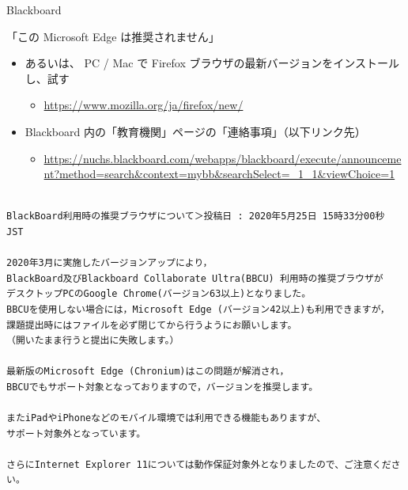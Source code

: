 \documentclass[a4j,10pt]{jsarticle}
\begin{document}
{\begin{frame}[label={sec:orgc119bb0},fragile]{Blackboard}
\begin{block}{「この Microsoft Edge は推奨されません」}
\begin{itemize}
\begin{itemize}
\end{itemize}
\par
\item あるいは、 PC / Mac で Firefox ブラウザの最新バージョンをインストールし、試す
\begin{itemize}
\item \url{https://www.mozilla.org/ja/firefox/new/}
\end{itemize}
\par
\item Blackboard 内の「教育機関」ページの「連絡事項」（以下リンク先）
\begin{itemize}
\item \url{https://nuchs.blackboard.com/webapps/blackboard/execute/announcement?method=search\&context=mybb\&searchSelect=\_1\_1\&viewChoice=1}
\end{itemize}
\end{itemize}
\par
\begin{verbatim}

BlackBoard利用時の推奨ブラウザについて＞投稿日 : 2020年5月25日 15時33分00秒 JST

2020年3月に実施したバージョンアップにより，
BlackBoard及びBlackboard Collaborate Ultra(BBCU) 利用時の推奨ブラウザが
デスクトップPCのGoogle Chrome(バージョン63以上)となりました。
BBCUを使用しない場合には，Microsoft Edge (バージョン42以上)も利用できますが，
課題提出時にはファイルを必ず閉じてから行うようにお願いします。
（開いたまま行うと提出に失敗します。）

最新版のMicrosoft Edge (Chronium)はこの問題が解消され，
BBCUでもサポート対象となっておりますので，バージョンを推奨します。

またiPadやiPhoneなどのモバイル環境では利用できる機能もありますが、
サポート対象外となっています。

さらにInternet Explorer 11については動作保証対象外となりましたので、ご注意ください。\end{verbatim}


\end{block}
\end{frame}}
\end{document}
